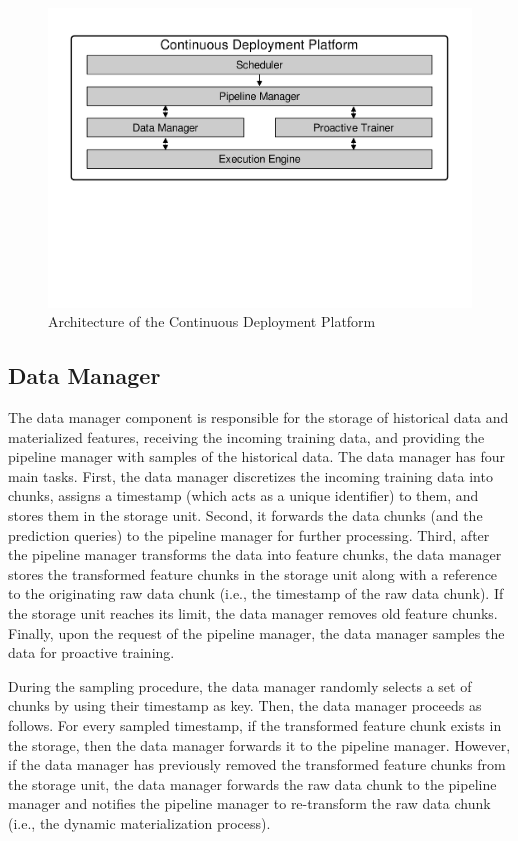 \begin{figure}[h]
\centering
\includegraphics[width=\columnwidth]{../images/system-architecture.pdf}
\caption{Architecture of the Continuous Deployment Platform}
 \vspace{-30pt}
\label{fig:system-architecture}
\end{figure}
\subsection{Data Manager} \label{data-manager}
The data manager component is responsible for the storage of historical data and materialized features, receiving the incoming training data, and providing the pipeline manager with samples of the historical data.
The data manager has four main tasks.
First, the data manager discretizes the incoming training data into chunks, assigns a timestamp (which acts as a unique identifier) to them, and stores them in the storage unit.
Second, it forwards the data chunks (and the prediction queries) to the pipeline manager for further processing.
Third, after the pipeline manager transforms the data into feature chunks, the data manager stores the transformed feature chunks in the storage unit along with a reference to the originating raw data chunk (i.e., the timestamp of the raw data chunk).
If the storage unit reaches its limit, the data manager removes old feature chunks.
Finally, upon the request of the pipeline manager, the data manager samples the data for proactive training.

During the sampling procedure, the data manager randomly selects a set of chunks by using their timestamp as key.
Then, the data manager proceeds as follows.
For every sampled timestamp, if the transformed feature chunk exists in the storage, then the data manager forwards it to the pipeline manager.
However, if the data manager has previously removed the transformed feature chunks from the storage unit, the data manager forwards the raw data chunk to the pipeline manager and notifies the pipeline manager to re-transform the raw data chunk (i.e., the dynamic materialization process).

